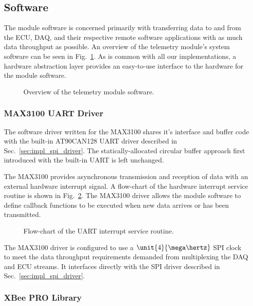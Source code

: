 \subsection{Software}

The module software is concerned primarily with transferring data to and from the ECU, DAQ, and their respective remote software applications with as much data throughput as possible. An overview of the telemetry module's system software can be seen in Fig.\ \ref{fig:telemetry_software_implementation}. As is common with all our implementations, a hardware abstraction layer provides an easy-to-use interface to the hardware for the module software.

\begin{figure}[H]
\centering

\caption{Overview of the telemetry module software.}
\label{fig:telemetry_software_implementation}
\end{figure}

\subsubsection{MAX3100 UART Driver}

The software driver written for the MAX3100 shares it's interface and buffer code with the built-in AT90CAN128 UART driver described in Sec.\ \ref{sec:impl_spi_driver}. The statically-allocated circular buffer approach first introduced with the built-in UART is left unchanged. 

The MAX3100 provides asynchronous transmission and reception of data with an external hardware interrupt signal. A flow-chart of the hardware interrupt service routine is shown in Fig.\ \ref{fig:usart_driver_flow}. The MAX3100 driver allows the module software to define callback functions to be executed when new data arrives or has been transmitted. 

\begin{figure}[H]
\centering

\caption{Flow-chart of the UART interrupt service routine.}
\label{fig:usart_driver_flow}
\end{figure}

The MAX3100 driver is configured to use a $\unit{4}{\mega\hertz}$ SPI clock to meet the data throughput requirements demanded from multiplexing the DAQ and ECU streams. It interfaces directly with the SPI driver described in Sec.\ \ref{sec:impl_spi_driver}.

\subsubsection{XBee PRO Library}

